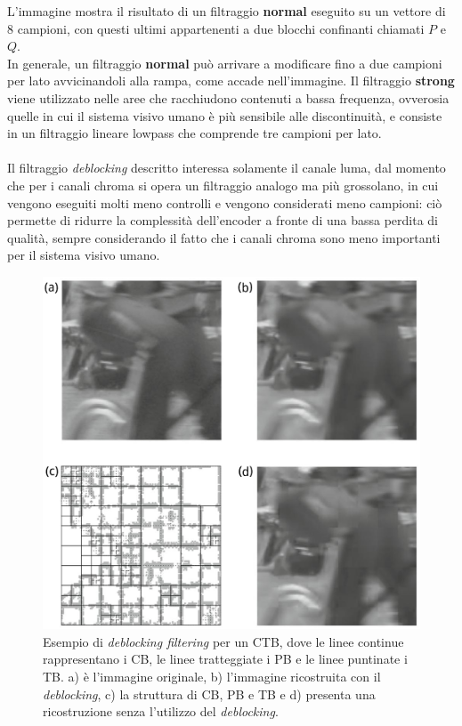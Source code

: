 L'immagine mostra il risultato di un filtraggio \textbf{normal} eseguito su un 
vettore di 8 campioni, con questi ultimi appartenenti a due blocchi confinanti 
chiamati $P$ e $Q$. \\
In generale, un filtraggio \textbf{normal} può arrivare a modificare fino a due
campioni per lato avvicinandoli alla rampa, come accade nell'immagine.
Il filtraggio \textbf{strong} viene utilizzato nelle aree che racchiudono 
contenuti a bassa frequenza, ovverosia quelle in cui il sistema visivo umano è 
più sensibile alle discontinuità, e consiste in un filtraggio lineare lowpass 
che comprende tre campioni per lato.
\\ \\
Il filtraggio \emph{deblocking} descritto interessa solamente il canale luma, 
dal momento che per i canali chroma si opera un filtraggio analogo ma più 
grossolano, in cui vengono eseguiti molti meno controlli e vengono considerati 
meno campioni: ciò permette di ridurre la complessità dell'encoder a fronte di 
una bassa perdita di qualità, sempre considerando il fatto che i canali chroma 
sono meno importanti per il sistema visivo umano.

\begin{figure}[H]
  \centering
  \captionsetup{justification=raggedright}
  \includegraphics[scale=.5]{Figures/deblocking_filter_example}
  \caption[Esempio di \emph{deblocking filtering}]
          {Esempio di \emph{deblocking filtering} per un CTB, dove le linee
           continue rappresentano i CB, le linee tratteggiate i PB e le linee
           puntinate i TB. a) è l'immagine originale, b) l'immagine ricostruita
           con il \emph{deblocking}, c) la struttura di CB, PB e TB e d) 
           presenta una ricostruzione senza l'utilizzo del \emph{deblocking}.}
\end{figure}

